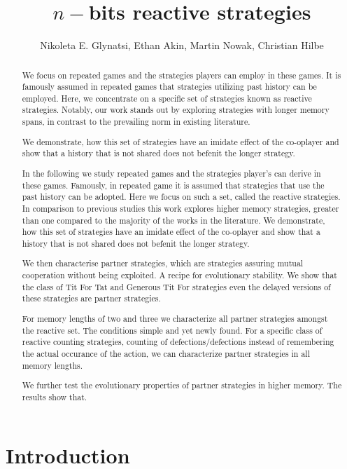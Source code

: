 \documentclass{article}
\title{$n-$bits reactive strategies}
\author{Nikoleta E. Glynatsi, Ethan Akin, Martin Nowak, Christian Hilbe}
\date{}
\theoremstyle{definition}
\begin{document}
\maketitle

\begin{abstract}

We focus on repeated games and the strategies players can employ in these
games. It is famously assumed in repeated games that strategies utilizing past
history can be employed. Here, we concentrate on a specific set of strategies
known as reactive strategies. Notably, our work stands out by exploring
strategies with longer memory spans, in contrast to the prevailing norm in
existing literature.

We demonstrate, how this set of strategies have an imidate effect
of the co-oplayer and show that a history that is not shared does not befenit
the longer strategy.


In the following we study repeated games and the strategies player's can
derive in these games. Famously, in repeated game it is assumed that strategies
that use the past history can be adopted. Here we focus on such a set, called the
reactive strategies. In comparison to previous studies this work explores higher
memory strategies, greater than one compared to the majority of the works in the
literature. We demonstrate, how this set of strategies have an imidate effect
of the co-oplayer and show that a history that is not shared does not befenit
the longer strategy.

We then characterise partner strategies, which are strategies assuring mutual
cooperation without being exploited. A recipe for evolutionary stability.
We show that the class of Tit For Tat and Generous Tit For strategies even the
delayed versions of these strategies are partner strategies.

For memory lengths of two and three we characterize all partner strategies
amongst the reactive set. The conditions simple and yet newly found. For a specific
class of reactive counting strategies, counting of defections/defections instead
of remembering the actual occurance of the action, we can characterize partner
strategies in all memory lengths.

We further test the evolutionary properties of partner strategies in higher memory.
The results show that.

\end{abstract}

\section{Introduction}
\end{document}
